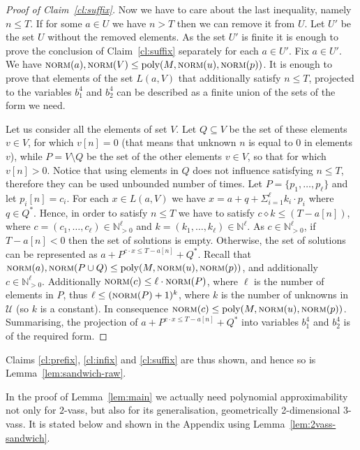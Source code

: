\documentclass[a4paper, UKenglish, cleveref, autoref, thm-restate]{lipics-v2021}
\newcommand{\N}{\mathbb{N}}
\newcommand{\set}[1]{\{#1\}}
\newcommand{\norm}{\textsc{norm}}
\newcommand{\poly}{\textup{poly}}
\newcommand{\vass}{{\sc vass}\xspace}
\newcommand{\dvass}{\parvass 2}
\newcommand{\tvass}{\parvass 3}
\newcommand{\geomvass}{geometrically 2-dimensional \tvass}
\newcommand{\parvass}[1]{{$#1$-\vass}\xspace}
\newcommand{\innprod}[2]{#1 \diamond #2} \newcommand{\pair}[2]{#1_{#2}}
\begin{document}
\begin{appendixproof}
\begin{proof}[Proof of Claim~\ref{cl:suffix}]
Now we have to care about the last inequality, namely $n \leq T$. If for some $a \in U$ we have $n > T$ then we can remove it from $U$. Let $U'$ be the set $U$ without the removed elements.
As the set $U'$ is finite it is enough to prove the conclusion of Claim~\ref{cl:suffix} separately for each $a \in U'$. Fix $a \in U'$.
We have $\norm(a), \norm(V) \leq \poly(M, \norm(u), \norm(p))$.
It is enough to prove that elements of the set $L(a, V)$ that additionally satisfy $n \leq T$, projected to the variables
$b^4_1$ and $b^4_2$ can be described as a finite union of the sets of the form we need.

Let us consider all the elements of set $V$. Let $Q \subseteq V$ be the set of these elements $v \in V$,
for which $v[n] = 0$ (that means that unknown $n$ is equal to $0$ in elements $v$),
while $P = V \setminus Q$ be the set of the other elements $v \in V$,
so that for which $v[n] > 0$.
Notice that using elements in $Q$ does not influence satisfying $n \leq T$, therefore they
can be used unbounded number of times.
Let $P = \set{p_1, \ldots, p_\ell}$ and let $p_i[n] = c_i$. For each $x \in L(a, V)$ we have $x = a + q + \Sigma_{i=1}^{\ell}k_i \cdot p_i$ where $q \in Q^*$. Hence, in order to satisfy $n \leq T$ we have to satisfy $\innprod c k \leq (T - a[n])$, where $c = (c_1, \ldots, c_\ell) \in \N_{>0}^\ell$ and $k = (k_1, \ldots, k_\ell) \in \N^\ell$.
As $c \in \N_{>0}^\ell$, if $T - a[n] < 0$ then the set of solutions is empty. Otherwise, the set of solutions can be represented as $a+P^{c \cdot x \leq T - a[n]}+Q^*$. Recall that $\norm(a), \norm(P \cup Q) \leq \poly(M, \norm(u), \norm(p))$, and additionally $c \in \N_{>0}^{\ell}$. Additionally $\norm(c) \leq \ell \cdot \norm(P)$, where
$\ell$ is the number of elements in $P$, thus $\ell \leq (\norm(P) + 1)^k$, where $k$ is the number of unknowns in $\mathcal U$
(so $k$ is a constant).
In consequence $\norm(c) \leq \poly(M, \norm(u), \norm(p))$. Summarising, the projection
of $a+P^{c \cdot x \leq T - a[n]}+Q^*$ into variables $b^4_1$ and $b^4_2$ is of the required form.
\end{proof}
Claims \ref{cl:prefix}, \ref{cl:infix} and \ref{cl:suffix} are thus shown, and hence so is Lemma~\ref{lem:sandwich-raw}.
\end{appendixproof}
 
In the proof of Lemma~\ref{lem:main} we actually need polynomial approximability not only for \dvass, but also for
its generalisation, \geomvass. It is stated below and shown in the Appendix using Lemma~\ref{lem:2vass-sandwich}.
\end{document}
